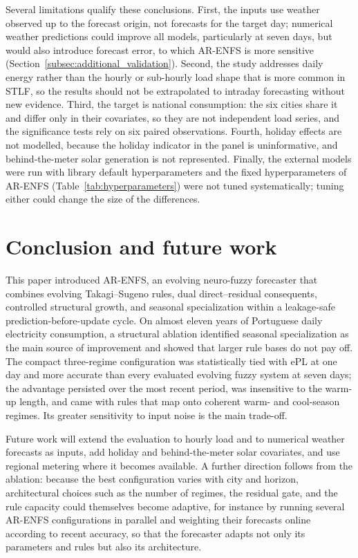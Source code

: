 \documentclass[preprint,12pt]{elsarticle}
\begin{document}
Several limitations qualify these conclusions. First, the inputs use weather observed up to the forecast origin, not forecasts for the target day; numerical weather predictions could improve all models, particularly at seven days, but would also introduce forecast error, to which AR-ENFS is more sensitive (Section~\ref{subsec:additional_validation}). Second, the study addresses daily energy rather than the hourly or sub-hourly load shape that is more common in STLF, so the results should not be extrapolated to intraday forecasting without new evidence. Third, the target is national consumption: the six cities share it and differ only in their covariates, so they are not independent load series, and the significance tests rely on six paired observations. Fourth, holiday effects are not modelled, because the holiday indicator in the panel is uninformative, and behind-the-meter solar generation is not represented. Finally, the external models were run with library default hyperparameters and the fixed hyperparameters of AR-ENFS (Table~\ref{tab:hyperparameters}) were not tuned systematically; tuning either could change the size of the differences.

\section{Conclusion and future work}
\label{sec:conclusion}

This paper introduced AR-ENFS, an evolving neuro-fuzzy forecaster that combines evolving Takagi--Sugeno rules, dual direct--residual consequents, controlled structural growth, and seasonal specialization within a leakage-safe prediction-before-update cycle. On almost eleven years of Portuguese daily electricity consumption, a structural ablation identified seasonal specialization as the main source of improvement and showed that larger rule bases do not pay off. The compact three-regime configuration was statistically tied with ePL at one day and more accurate than every evaluated evolving fuzzy system at seven days; the advantage persisted over the most recent period, was insensitive to the warm-up length, and came with rules that map onto coherent warm- and cool-season regimes. Its greater sensitivity to input noise is the main trade-off.

Future work will extend the evaluation to hourly load and to numerical weather forecasts as inputs, add holiday and behind-the-meter solar covariates, and use regional metering where it becomes available. A further direction follows from the ablation: because the best configuration varies with city and horizon, architectural choices such as the number of regimes, the residual gate, and the rule capacity could themselves become adaptive, for instance by running several AR-ENFS configurations in parallel and weighting their forecasts online according to recent accuracy, so that the forecaster adapts not only its parameters and rules but also its architecture.
\end{document}
